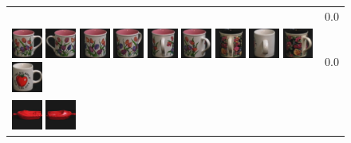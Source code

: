 \begin{figure}[bp]
\begin{tabular}{m{11cm} | m{3cm} |}
& {\scriptsize 0.0}
\\
\includegraphics[width=1cm]{coil/beeld-6.eps}
\includegraphics[width=1cm]{coil/beeld-7.eps}
\includegraphics[width=1cm]{coil/beeld-8.eps}
\includegraphics[width=1cm]{coil/beeld-9.eps}
\includegraphics[width=1cm]{coil/beeld-11.eps}
\includegraphics[width=1cm]{coil/beeld-10.eps}
\includegraphics[width=1cm]{coil/beeld-65.eps}
\includegraphics[width=1cm]{coil/beeld-41.eps}
\includegraphics[width=1cm]{coil/beeld-64.eps}
\includegraphics[width=1cm]{coil/beeld-36.eps}
& {\scriptsize 0.0}
\\
\includegraphics[width=1cm]{coil/beeld-18.eps}
\includegraphics[width=1cm]{coil/beeld-19.eps}

\end{tabular}
\end{figure}
